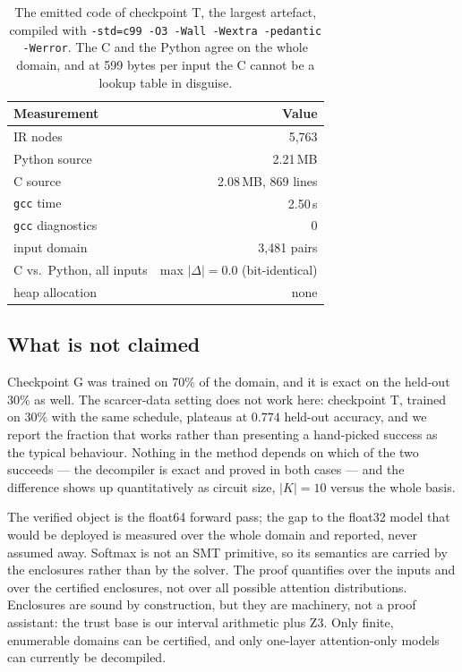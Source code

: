 \documentclass[11pt]{article}
\newcommand{\code}[1]{\texttt{#1}}
\begin{document}
\begin{table}[t]
\centering
\small
\begin{tabular}{@{}lr@{}}
\toprule
Measurement & Value \\
\midrule
IR nodes & 5{,}763 \\
Python source & 2.21\,MB \\
C source & 2.08\,MB, 869 lines \\
\code{gcc} time & 2.50\,s \\
\code{gcc} diagnostics & 0 \\
input domain & 3{,}481 pairs \\
C vs.\ Python, all inputs & max $|\Delta| = 0.0$ (bit-identical) \\
heap allocation & none \\
\bottomrule
\end{tabular}
\caption{The emitted code of checkpoint T, the largest artefact, compiled with \code{-std=c99 -O3 -Wall -Wextra -pedantic -Werror}. The C and the Python agree on the whole domain, and at 599 bytes per input the C cannot be a lookup table in disguise.}\label{tab:export}
\end{table}

\subsection{What is not claimed}
\label{sec:notclaimed}

Checkpoint G was trained on $70\%$ of the domain, and it is exact on the held-out $30\%$ as well. The scarcer-data setting does not work here: checkpoint T, trained on $30\%$ with the same schedule, plateaus at $0.774$ held-out accuracy, and we report the fraction that works rather than presenting a hand-picked success as the typical behaviour. Nothing in the method depends on which of the two succeeds --- the decompiler is exact and proved in both cases --- and the difference shows up quantitatively as circuit size, $|K|=10$ versus the whole basis.

The verified object is the float64 forward pass; the gap to the float32 model that would be deployed is measured over the whole domain and reported, never assumed away. Softmax is not an SMT primitive, so its semantics are carried by the enclosures rather than by the solver. The proof quantifies over the inputs and over the certified enclosures, not over all possible attention distributions. Enclosures are sound by construction, but they are machinery, not a proof assistant: the trust base is our interval arithmetic plus Z3. Only finite, enumerable domains can be certified, and only one-layer attention-only models can currently be decompiled.
\end{document}
